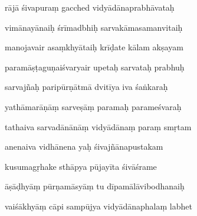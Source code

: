 rājā śivapuraṃ gacched vidyādānaprabhāvataḥ  \veg\dontdisplaylinenum

vimānayānaiḥ śrīmadbhiḥ sarvakāmasamanvitaiḥ \thinspace{\dandab} \dontdisplaylinenum

manojavair asaṃkhyātaiḥ krīḍate kālam akṣayam  \veg\dontdisplaylinenum 

paramāṣṭaguṇaiśvaryair upetaḥ sarvataḥ prabhuḥ \thinspace{\dandab} \dontdisplaylinenum

sarvajñaḥ paripūrṇātmā dvitīya iva śaṅkaraḥ  \veg\dontdisplaylinenum 

yathāmarāṇāṃ sarveṣāṃ paramaḥ parameśvaraḥ \thinspace{\dandab} \dontdisplaylinenum

tathaiva sarvadānānāṃ vidyādānaṃ paraṃ smṛtam  \veg\dontdisplaylinenum

anenaiva vidhānena yaḥ śivajñānapustakam \thinspace{\dandab} \dontdisplaylinenum

kusumagṛhake sthāpya pūjayīta śivāśrame  \veg\dontdisplaylinenum

āṣāḍhyāṃ pūrṇamāsyāṃ tu dīpamālāvibodhanaiḥ \thinspace{\dandab} \dontdisplaylinenum

vaiśākhyāṃ cāpi sampūjya vidyādānaphalaṃ labhet  \veg\dontdisplaylinenum

